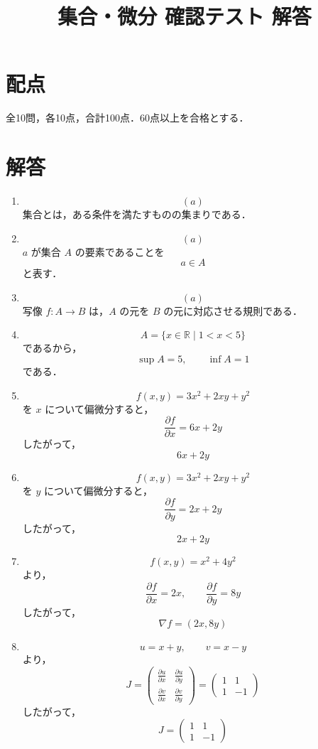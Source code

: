 \documentclass[uplatex,a4paper,12pt]{jsarticle}
\begin{document}
\title{集合・微分 確認テスト 解答}
\author{}
\date{}
\maketitle

\section*{配点}
全10問，各10点，合計100点．60点以上を合格とする．

\section*{解答}

\begin{enumerate}

\item
\[
\boxed{(a)}
\]
集合とは，ある条件を満たすものの集まりである．

\item
\[
\boxed{(a)}
\]
$a$ が集合 $A$ の要素であることを
\[
a\in A
\]
と表す．

\item
\[
\boxed{(a)}
\]
写像 $f:A\to B$ は，$A$ の元を $B$ の元に対応させる規則である．

\item
\[
A=\{x\in \mathbb{R}\mid 1<x<5\}
\]
であるから，
\[
\boxed{\sup A=5,\qquad \inf A=1}
\]
である．

\item
\[
f(x,y)=3x^2+2xy+y^2
\]
を $x$ について偏微分すると，
\[
\frac{\partial f}{\partial x}
=
6x+2y
\]
したがって，
\[
\boxed{6x+2y}
\]

\item
\[
f(x,y)=3x^2+2xy+y^2
\]
を $y$ について偏微分すると，
\[
\frac{\partial f}{\partial y}
=
2x+2y
\]
したがって，
\[
\boxed{2x+2y}
\]

\item
\[
f(x,y)=x^2+4y^2
\]
より，
\[
\frac{\partial f}{\partial x}=2x,
\qquad
\frac{\partial f}{\partial y}=8y
\]
したがって，
\[
\boxed{\nabla f=(2x,8y)}
\]

\item
\[
u=x+y,\qquad v=x-y
\]
より，
\[
J=
\begin{pmatrix}
\frac{\partial u}{\partial x} & \frac{\partial u}{\partial y}\\
\frac{\partial v}{\partial x} & \frac{\partial v}{\partial y}
\end{pmatrix}
=
\begin{pmatrix}
1&1\\
1&-1
\end{pmatrix}
\]
したがって，
\[
\boxed{
J=
\begin{pmatrix}
1&1\\
1&-1
\end{pmatrix}
}
\]


\end{enumerate}
\end{document}
